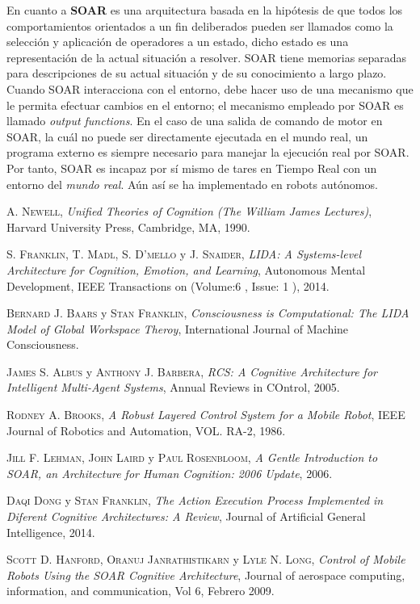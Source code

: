 \documentclass[a4paper, fontsize=11pt]{scrartcl} %
\numberwithin{equation}{section} %
\numberwithin{figure}{section} %
\numberwithin{table}{section} %
\begin{document}
	En cuanto a \textbf{SOAR}\cite{SOAR} es una arquitectura basada en la hipótesis de que todos los comportamientos orientados a un fin deliberados pueden ser llamados como la selección y aplicación de operadores a un estado, dicho estado es una representación de la actual situación a resolver. SOAR tiene memorias separadas para descripciones de su actual situación y de su conocimiento a largo plazo.\\
	
	Cuando SOAR interacciona con el entorno\cite{ARCHITECTURES}, debe hacer uso de una mecanismo que le permita efectuar cambios en el entorno; el mecanismo empleado por SOAR es llamado \textit{output functions}. En el caso de una salida de comando de motor en SOAR, la cuál no puede ser directamente ejecutada en el mundo real, un programa externo es siempre necesario para manejar la ejecución real por SOAR. Por tanto, SOAR es incapaz por sí mismo de tares en Tiempo Real con un entorno del \textit{mundo real}. Aún así se ha implementado en robots autónomos\cite{SOARROBOT}. 
	
	 
	
	\begin{thebibliography}{X}
		
		 \textsc{A. Newell}, \textit{Unified Theories of Cognition (The William James Lectures)}, Harvard University Press, Cambridge, MA, 1990.
		
		 \textsc{S. Franklin, T. Madl, S. D'mello} y \textsc{J. Snaider}, \textit{LIDA: A Systems-level Architecture for Cognition, Emotion, and Learning}, Autonomous Mental Development, IEEE Transactions on  (Volume:6 ,  Issue: 1 ), 2014.
		
		 \textsc{Bernard J. Baars} y \textsc{Stan Franklin}, \textit{Consciousness is Computational: The LIDA Model of Global Workspace Theroy}, International Journal of Machine Consciousness.
		
		 \textsc{James S. Albus} y \textsc{Anthony J. Barbera}, \textit{RCS: A Cognitive Architecture for Intelligent Multi-Agent Systems}, Annual Reviews in COntrol, 2005.
		
		 \textsc{Rodney A. Brooks}, \textit{A Robust Layered Control System for a Mobile Robot}, IEEE Journal of Robotics and Automation, VOL. RA-2, 1986.
		
		 \textsc{Jill F. Lehman, John Laird} y \textsc{Paul Rosenbloom}, \textit{A Gentle Introduction to SOAR, an Architecture for Human Cognition: 2006 Update}, 2006.
		
		 \textsc{Daqi Dong} y \textsc{Stan Franklin}, \textit{The Action Execution Process Implemented in Diferent Cognitive Architectures: A Review}, Journal of Artificial General Intelligence, 2014.
		
		 \textsc{Scott D. Hanford, Oranuj Janrathistikarn} y \textsc{Lyle N. Long}, \textit{Control of Mobile Robots Using the SOAR Cognitive Architecture}, Journal of aerospace computing, information, and communication, Vol 6, Febrero 2009.
		
	\end{thebibliography}
	
 	
\end{document}
